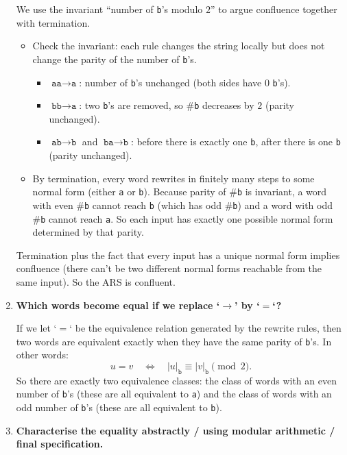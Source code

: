 \documentclass{article}
\theoremstyle{plain}
\theoremstyle{definition}
\theoremstyle{remark}
\begin{document}
\begin{enumerate}[label=(\alph*)]
  We use the invariant ``number of \texttt{b}'s modulo $2$'' to argue confluence together with termination.
  
  \begin{itemize}
    \item Check the invariant: each rule changes the string locally but does not change the parity of the number of \texttt{b}'s.
      \begin{itemize}
        \item $\texttt{aa}\to\texttt{a}$: number of \texttt{b}'s unchanged (both sides have 0 \texttt{b}'s).
        \item $\texttt{bb}\to\texttt{a}$: two \texttt{b}'s are removed, so \#\texttt{b} decreases by $2$ (parity unchanged).
        \item $\texttt{ab}\to\texttt{b}$ and $\texttt{ba}\to\texttt{b}$: before there is exactly one \texttt{b}, after there is one \texttt{b} (parity unchanged).
      \end{itemize}
    \item By termination, every word rewrites in finitely many steps to some normal form (either \texttt{a} or \texttt{b}). Because parity of \#\texttt{b} is invariant, a word with even \#\texttt{b} cannot reach \texttt{b} (which has odd \#\texttt{b}) and a word with odd \#\texttt{b} cannot reach \texttt{a}. So each input has exactly one possible normal form determined by that parity.
  \end{itemize}
  
  Termination plus the fact that every input has a unique normal form implies confluence (there can't be two different normal forms reachable from the same input). So the ARS is confluent.
  
  \item \textbf{Which words become equal if we replace `$\to$' by `$=$`?}
  
  If we let `$=$` be the equivalence relation generated by the rewrite rules, then two words are equivalent exactly when they have the same parity of \texttt{b}'s. In other words:
  \[
    u = v \quad\Longleftrightarrow\quad |u|_{\texttt{b}} \equiv |v|_{\texttt{b}} \pmod{2}.
  \]
  So there are exactly two equivalence classes: the class of words with an even number of \texttt{b}'s (these are all equivalent to \texttt{a}) and the class of words with an odd number of \texttt{b}'s (these are all equivalent to \texttt{b}).
  
  \item \textbf{Characterise the equality abstractly / using modular arithmetic / final specification.}
  

\end{enumerate}
\end{document}
